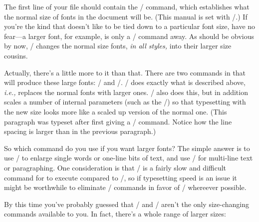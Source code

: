 The first line of your \jyTeX{} file should contain the \tts\typesize/ command,
which establishes what the normal size of fonts in the document will be.  (This
manual is set with \tts\typesize=12pt/.)  If you're the kind that doesn't like
to be tied down to a particular font size, have no fear---a larger font, for
example, is only a \tts\bigfonts/ {\bigfonts command away.  As should be
obvious by now, \tts\bigfonts/ changes the normal size fonts, {\it in all
styles,} into their larger size cousins.}

{\bigsize

Actually, there's a little more to it than that.  There are two commands in
\jyTeX{} that will produce these large fonts: \tts\bigfonts/ and \tts\bigsize/.
\tts\bigfonts/ does exactly what is described above, {\it i.e.,} replaces the
normal fonts with larger ones.  \tts\bigsize/ also does this, but in addition
scales a number of internal parameters (such as the \tts\baselineskip/) so that
typesetting with the new size looks more like a scaled up version of the normal
one.  (This paragraph was typeset after first giving a \tts\bigsize/ command.
Notice how the line spacing is larger than in the previous paragraph.)

}

So which command do you use if you want larger fonts?  The simple answer is to
use \tts\bigfonts/ to enlarge single words or one-line bits of text, and use
\tts\bigsize/ for multi-line text or paragraphing.  One consideration is
that \tts\bigsize/ is a fairly slow and difficult command for \jyTeX{} to
execute compared to \tts\bigfonts/, so if typesetting speed is an issue it
might be worthwhile to eliminate \tts\bigsize/ commands in favor of
\tts\bigfonts/ whereever possible.

By this time you've probably guessed that \tts\bigfonts/ and \tts\bigsize/
aren't the only size-changing commands available to you.  In fact, there's 
a whole range of larger sizes:

\smallskip



